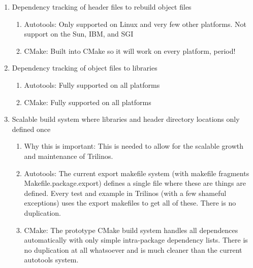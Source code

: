 \documentclass[pdf,ps2pdf,11pt]{SANDreport}
\begin{document}
\begin{enumerate}

{}\item Dependency tracking of header files to rebuild object files

  \begin{enumerate}

  {}\item Autotools: Only supported on Linux and very few other
  platforms.  Not support on the Sun, IBM, and SGI

  {}\item CMake: Built into CMake so it will work on every platform,
  period!

  \end{enumerate}

{}\item Dependency tracking of object files to libraries

  \begin{enumerate}

  {}\item Autotools: Fully supported on all platforms

  {}\item CMake: Fully supported on all platforms

  \end{enumerate}

{}\item Scalable build system where libraries and header directory
locations only defined once

  \begin{enumerate}

  {}\item Why this is important: This is needed to allow for the
  scalable growth and maintenance of Trilinos.

  {}\item Autotools: The current export makefile system (with
  makefile fragments Makefile.package.export) defines a single file
  where these are things are defined.  Every test and example in
  Trilinos (with a few shameful exceptions) uses the export
  makefiles to get all of these.  There is no duplication.

  {}\item CMake: The prototype CMake build system handles all
  dependences automatically with only simple intra-package dependency
  lists.  There is no duplication at all whatsoever and is much
  cleaner than the current autotools system.

  \end{enumerate}


\end{enumerate}
\end{document}
